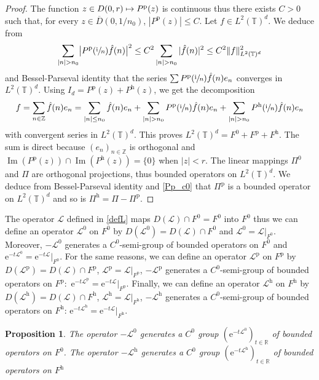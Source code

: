 \documentclass[JEP,XML,SOM,Unicode,NoEqCountersInSection]{cedram}
\let\mathcal\mathscr
\def\mto{\mathchoice{\longmapsto}{\mapsto}{\mapsto}{\mapsto}}
\theoremstyle{plain}
\newtheorem{prop}[theorem]{Proposition}
\theoremstyle{definition}
\theoremstyle{remark}
\DeclareMathOperator{\Ima}{Im}
\newcommand{\set}{\mathbb}
\newcommand{\Z}{\set{Z}}
\newcommand{\R}{} %
\renewcommand{\R}{\set{R}}
\newcommand{\T}{\set{T}}
\newcommand{\h}{{\mathrm h}}
\newcommand{\p}{{\mathrm p}}
\newcommand{\eu}{\mathrm e}
\newcommand{\iu}{\mathrm i}
\let\originalleft\left
\let\originalright\right
\renewcommand{\left}{\mathopen{}\mathclose\bgroup\originalleft}
\renewcommand{\right}{\aftergroup\egroup\originalright}
\begin{document}
\begin{proof}
The function $z \in D(0,r) \mto P^\p(z)$ is continuous thus there exists $C>0$ such that, for every $z \in \overline{D}(0,1/n_0)$, $|P^\p(z)|\leq C$. Let $f \in L^2(\T)^d$. We deduce from
\begin{equation} \label{Pp_c0}
\sum_{|n| > n_0} \bigl| P^\p\left(\sfrac{\iu}{n}\right) \hat{f}(n) \bigr|^2 \leq C^2
\sum_{|n| > n_0} |\hat{f}(n)|^2 \leq C^2 \|f\|_{L^2(\T)^d}^2
\end{equation}
and Bessel-Parseval identity that the series $\sum P^\p\left(\sfrac{\iu}{n}\right) \hat{f}(n) e_n$ converges in $L^2(\T)^d$.
Using $I_d=P^\p(z)+P^\h(z)$, we get the decomposition
\[
f = \sum_{n\in\Z} \hat{f}(n) e_n =
\sum_{|n|\leq n_0} \hat{f}(n) e_n +
\sum_{|n| > n_0} P^\p\left(\sfrac{\iu}{n}\right) \hat{f}(n) e_n +
\sum_{|n| > n_0} P^\h\left(\sfrac{\iu}{n}\right) \hat{f}(n) e_n
\]
with convergent series in $L^2(\T)^d$.
This proves $L^2(\T)^{d} = F^0 + F^\p + F^\h$. The sum is direct because $(e_n)_{n\in\Z}$ is orthogonal and $\Ima(P^\p(z))\cap\Ima(P^\h(z))=\{0\}$ when $|z|<r$.
The linear mappings $\Pi^0$ and $\Pi$ are orthogonal projections, thus bounded operators on $L^2(\T)^d$. We deduce from Bessel-Parseval identity and \eqref{Pp_c0} that
$\Pi^\p$ is a bounded operator on $L^2(\T)^d$ and so is $\Pi^\h=\Pi-\Pi^\p$.
\end{proof}

The operator $\mathcal{L}$ defined in \eqref{defL} maps $D(\mathcal{L})\cap F^0 = F^0$ into $F^0$ thus we can define an operator $\mathcal{L}^0$ on $F^0$ by
$D(\mathcal{L}^0)=D(\mathcal{L})\cap F^0$ and $\mathcal{L}^0=\mathcal{L}|_{F^0}$. Moreover, $-\mathcal{L}^0$ generates a $C^0$-semi-group of bounded operators on $F^0$ and $\eu^{-t\mathcal{L}^0}=\eu^{-t\mathcal{L}}|_{F^0}$.
For the same reasons, we can define an operator $\mathcal{L}^\p$ on $F^\p$ by $D(\mathcal{L}^\p)=D(\mathcal{L})\cap F^\p$, $\mathcal{L}^\p=\mathcal{L}|_{F^\p}$, $-\mathcal{L}^\p$ generates a $C^0$-semi-group of bounded operators on \hbox{$F^\p$: $\eu^{-t\mathcal{L}^\p}=\eu^{-t\mathcal{L}}|_{F^\p}$}.
Finally, we can define an operator $\mathcal{L}^\h$ on $F^\h$ by $D(\mathcal{L}^\h)=D(\mathcal{L})\cap F^\h$, $\mathcal{L}^\h=\mathcal{L}|_{F^\h}$, $-\mathcal{L}^\h$ generates a $C^0$-semi-group of bounded operators on $F^\h$: $\eu^{-t\mathcal{L}^\h}=\eu^{-t\mathcal{L}}|_{F^\h}$.

\begin{prop}\label{ExtendSemigroups}
The operator $-\mathcal{L}^0$ generates a $C^0$ group $(\eu^{-t\mathcal{L}^0})_{t\in\R}$ of bounded operators on $F^0$.
The operator $-\mathcal{L}^\h$ generates a $C^0$ group $(\eu^{-t\mathcal{L}^\h})_{t\in\R}$ of bounded operators on $F^\h$
\end{prop}
\end{document}
